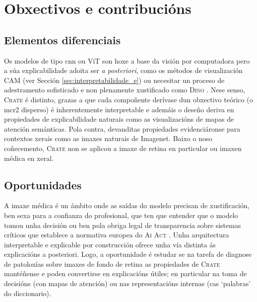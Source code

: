 \section{Obxectivos e contribucións}
\subsection{Elementos diferenciais}

Os modelos de tipo \acrshort{cnn} ou ViT son hoxe a base da visión por computadora pero a súa \gls{explicabilidade} adoita ser \emph{a posteriori}, como os métodos de visualización CAM (ver Sección \ref{sec:interpretabilidade_e}) ou necesitar un proceso de adestramento sofisticado e non plenamente xustificado como \textsc{Dino} \cite{dino}. Nese senso, \textsc{Crate} \cite{crate} é distinto, grazas a que cada compoñente derívase dun obxectivo teórico (o \acrshort{mcr2} disperso) é inherentemente interpretable e ademáis o deseño deriva en propiedades de \gls{explicabilidade} naturais como as visualizacións de mapas de atención semánticas. Pola contra, devanditas propiedades evidenciáronse para contextos xerais como as imaxes naturais de Imagenet. Baixo o noso coñecemento, \textsc{Crate} non se aplicou a imaxe de retina en particular ou imaxen médica en xeral.

\subsection{Oportunidades}
\label{sec:oportunidades}

A imaxe médica é un ámbito onde as saídas do modelo precisan de xustificación, ben sexa para a confianza do profesional, que ten que entender que o modelo tomou unha decisión ou ben pola obriga legal de transparencia sobre sistemas críticos que establece a normativa europea do \textsc{Ai Act} \cite{ai_act}. Unha arquitectura interpretable e explicable por construcción ofrece unha vía distinta ás explicacións a posteriori. Logo, a oportunidade é estudar se na tarefa de diagnose de patoloxías sobre imaxes de fondo de retina as propiedades de \textsc{Crate} mantéñense e poden convertirse en explicacións útiles; en particular na toma de decisións (con mapas de atención) ou nas representacións internas (cas `palabras' do diccionario).

